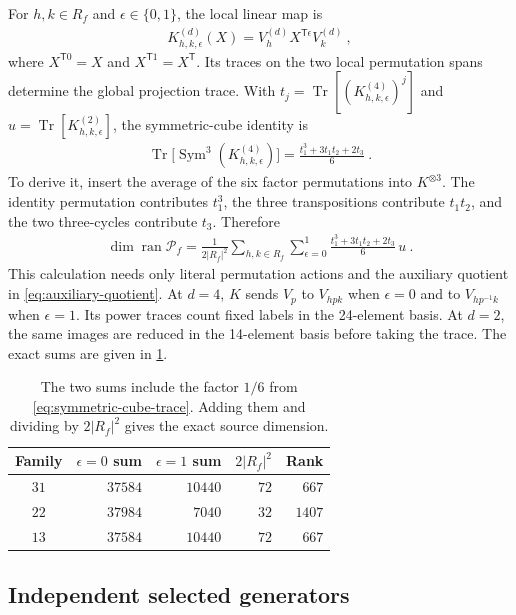 \documentclass[aps,pra,reprint,superscriptaddress,amsmath,amssymb,floatfix,nofootinbib]{revtex4-2}
\newcommand{\Tr}{\operatorname{Tr}}
\newcommand{\ran}{\operatorname{ran}}
\newcommand{\Sym}{\operatorname{Sym}}
\begin{document}
For $h,k\in R_f$ and $\epsilon\in\{0,1\}$, the local linear map is
\begin{align}
 K_{h,k,\epsilon}^{(d)}(X)=V_h^{(d)}X^{\mathsf T\epsilon}V_k^{(d)}\ ,
 \label{eq:local-linear-action}
\end{align}
where $X^{\mathsf T0}=X$ and $X^{\mathsf T1}=X^{\mathsf T}$.
Its traces on the two local permutation spans determine the global
projection trace. With
$t_j=\Tr[(K_{h,k,\epsilon}^{(4)})^j]$ and
$u=\Tr[K_{h,k,\epsilon}^{(2)}]$, the symmetric-cube identity is
\begin{align}
 \Tr\bigl[\Sym^3(K_{h,k,\epsilon}^{(4)})\bigr]
 =\frac{t_1^3+3t_1t_2+2t_3}{6}\ .
 \label{eq:symmetric-cube-trace}
\end{align}
To derive it, insert the average of the six factor permutations into
$K^{\otimes3}$. The identity permutation contributes $t_1^3$, the three
transpositions contribute $t_1t_2$, and the two three-cycles contribute
$t_3$.
Therefore
\begin{align}
 \dim\ran\mathcal P_f
 =\frac1{2|R_f|^2}\sum_{h,k\in R_f}\sum_{\epsilon=0}^1
       \frac{t_1^3+3t_1t_2+2t_3}{6}\,u\ .
 \label{eq:source-rank-formula}
\end{align}
This calculation needs only literal permutation actions and the auxiliary
quotient in \cref{eq:auxiliary-quotient}.
At $d=4$, $K$ sends $V_p$ to $V_{hpk}$ when $\epsilon=0$ and to
$V_{hp^{-1}k}$ when $\epsilon=1$.
Its power traces count fixed labels in the 24-element basis.
At $d=2$, the same images are reduced in the 14-element basis before
taking the trace.
The exact sums are given in \cref{tab:source-traces}.

\begin{table}[ht]
\centering
\begin{tabular}{crrrr}
\toprule
Family & $\epsilon=0$ sum & $\epsilon=1$ sum & $2|R_f|^2$ & Rank\\
\midrule
$31$ & $37584$ & $10440$ & $72$ & $667$\\
$22$ & $37984$ & $7040$ & $32$ & $1407$\\
$13$ & $37584$ & $10440$ & $72$ & $667$\\
\bottomrule
\end{tabular}
\caption{The two sums include the factor $1/6$ from
\cref{eq:symmetric-cube-trace}. Adding them and dividing by
$2|R_f|^2$ gives the exact source dimension.}
\label{tab:source-traces}
\end{table}

\subsection{Independent selected generators}
\end{document}
